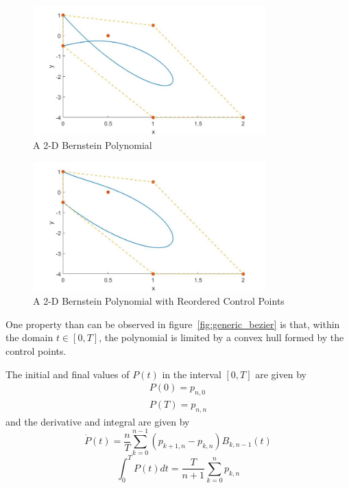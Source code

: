 \begin{figure}[h!]
\centering
\includegraphics[width=0.8\textwidth]{Images/generic_bezier2D.jpg}
\caption{A 2-D Bernstein Polynomial}
\label{fig:generic_bezier2D}
\end{figure}

\begin{figure}[h!]
\centering
\includegraphics[width=0.8\textwidth]{Images/generic_bezier2D_reordered.jpg}
\caption{A 2-D Bernstein Polynomial with Reordered Control Points}
\label{fig:generic_bezier2D_reordered}
\end{figure}


\par One property than can be observed in figure~\ref{fig:generic_bezier} is that, within the domain $t \in [0,T]$, the polynomial is limited by a convex hull \cite{cichella2018bernstein} formed by the control points.
\par The initial and final values of $P(t)$ in the interval $[0,T]$ are given by
\begin{equation}
    \label{eq:bern_in_fin}
    \begin{gathered}
        P(0) = p_{n,0} \\
        P(T) = p_{n,n}
    \end{gathered}
\end{equation}
and the derivative and integral are given by 
\begin{equation}
    \label{eq:bern_deriv}
    \dot{P}(t) = \frac{n}{T} \sum_{k=0}^{n-1} (p_{k+1,n} - p_{k,n}) B_{k,n-1}(t)
\end{equation}
\begin{equation}
    \label{eq:bern_int}
    \int_0^T P(t)dt = \frac{T}{n+1} \sum_{k=0}^{n} p_{k,n}
\end{equation}

